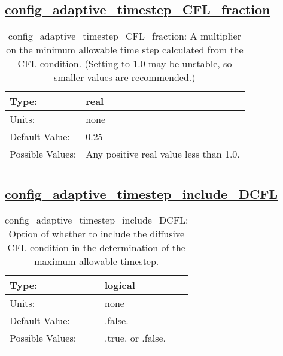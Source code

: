 \subsection[config\_adaptive\_timestep\_CFL\_fraction]{\hyperref[sec:nm_tab_time_integration]{config\_adaptive\_timestep\_CFL\_fraction}}
\label{subsec:nm_sec_config_adaptive_timestep_CFL_fraction}
\begin{center}
\begin{longtable}{| p{2.0in} || p{4.0in} |}
    \hline
    Type: & real \\
    \hline
    Units: & \si{none} \\
    \hline
    Default Value: & 0.25 \\
    \hline
    Possible Values: & Any positive real value less than 1.0. \\
    \hline
    \caption{config\_adaptive\_timestep\_CFL\_fraction: A multiplier on the minimum allowable time step calculated from the CFL condition. (Setting to 1.0 may be unstable, so smaller values are recommended.)}
\end{longtable}
\end{center}
\subsection[config\_adaptive\_timestep\_include\_DCFL]{\hyperref[sec:nm_tab_time_integration]{config\_adaptive\_timestep\_include\_DCFL}}
\label{subsec:nm_sec_config_adaptive_timestep_include_DCFL}
\begin{center}
\begin{longtable}{| p{2.0in} || p{4.0in} |}
    \hline
    Type: & logical \\
    \hline
    Units: & \si{none} \\
    \hline
    Default Value: & .false. \\
    \hline
    Possible Values: & .true. or .false. \\
    \hline
    \caption{config\_adaptive\_timestep\_include\_DCFL: Option of whether to include the diffusive CFL condition in the determination of the maximum allowable timestep.}
\end{longtable}
\end{center}
